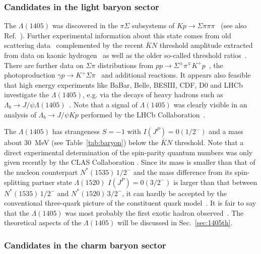 \subsubsection{Candidates in the light baryon sector}
\label{sec:lam1405exp}

The $\Lambda(1405)$ was discovered  in the $\pi\Sigma$ subsystems of  $Kp\to
\Sigma\pi\pi\pi$~\cite{Alston:1961zzd} (see also
Ref.~\cite{Kim:1965zzd,Hemingway:1984pz}).
Further experimental information about this state comes from old scattering
data~\cite{Humphrey:1962zz,Sakitt:1965kh,Watson:1963zz,Ciborowski:1982et}
complemented by the recent  $\bar{K}N$ threshold amplitude extracted from data
on kaonic hydrogen~\cite{Bazzi:2011zj,Bazzi:2012eq} as well as the older
so-called threshold ratios~\cite{Tovee:1971ga,Nowak:1978au}.
There are further data on $\Sigma\pi$ distributions from $pp\to \Sigma^\pm
\pi^\mp K^+p$~\cite{Zychor:2007gf,Agakishiev:2012xk}, the photoproduction
$\gamma p\to K^+\Sigma\pi$~\cite{Moriya:2014kpv} and additional reactions.
It appears also feasible that high energy experiments  like BaBar, Belle,
BESIII, CDF, D0 and LHCb investigate the $\Lambda(1405)$, e.g. via the decays
of heavy hadrons such as $\Lambda_b\to J/\psi
\Lambda(1405)$~\cite{Roca:2015tea}.
Note that a signal of $\Lambda(1405)$ was clearly visible  in an analysis of
$\Lambda_b\to J/\psi Kp$ performed by the LHCb
Collaboration~\cite{Aaij:2015tga}.

The $\Lambda(1405)$ has strangeness $S=-1$ with $I(J^P)=0(1/2^-)$ and a mass
about 30~MeV (see Table~\ref{tab:baryon}) below the $\bar{K}N$ threshold.
Note that a direct experimental determination of the spin-parity quantum numbers
was only given recently by the CLAS Collaboration \cite{Moriya:2014kpv}.
Since its mass is smaller than that of the nucleon counterpart
$N^*(1535)\,1/2^-$ and the mass difference from its spin-splitting partner state
$\Lambda(1520)$ $I(J^P)=0(3/2^-)$ is larger than that between $N^*(1535)\,1/2^-$
and $N^*(1520)\,3/2^-$, it can hardly be accepted by the conventional
three-quark picture of the constituent quark model~\cite{Hyodo:2011ur}.
It is fair to say that the $\Lambda(1405)$ {was most probably} the
first exotic hadron observed~\cite{Alston:1961zzd}. The theoretical aspects of the
$\Lambda(1405)$ will be discussed in Sec.~\ref{sec:1405th}.



\subsubsection{Candidates in the charm baryon sector}

